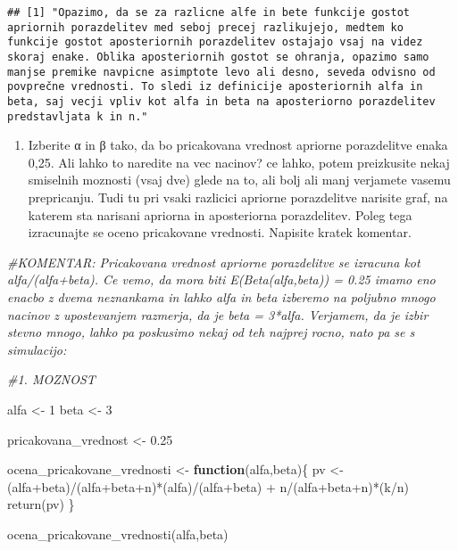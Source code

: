 \documentclass[
]{article}
\newenvironment{Shaded}{\begin{snugshade}}{\end{snugshade}}
\newcommand{\CommentTok}[1]{\textcolor[rgb]{0.56,0.35,0.01}{\textit{#1}}}
\newcommand{\ControlFlowTok}[1]{\textcolor[rgb]{0.13,0.29,0.53}{\textbf{#1}}}
\newcommand{\DecValTok}[1]{\textcolor[rgb]{0.00,0.00,0.81}{#1}}
\newcommand{\FloatTok}[1]{\textcolor[rgb]{0.00,0.00,0.81}{#1}}
\newcommand{\FunctionTok}[1]{\textcolor[rgb]{0.00,0.00,0.00}{#1}}
\newcommand{\NormalTok}[1]{#1}
\newcommand{\OtherTok}[1]{\textcolor[rgb]{0.56,0.35,0.01}{#1}}
\newcommand{\SpecialCharTok}[1]{\textcolor[rgb]{0.00,0.00,0.00}{#1}}
\providecommand{\tightlist}{%
  \setlength{\itemsep}{0pt}\setlength{\parskip}{0pt}}
\begin{document}
\begin{verbatim}
## [1] "Opazimo, da se za razlicne alfe in bete funkcije gostot apriornih porazdelitev med seboj precej razlikujejo, medtem ko funkcije gostot aposteriornih porazdelitev ostajajo vsaj na videz skoraj enake. Oblika aposteriornih gostot se ohranja, opazimo samo manjse premike navpicne asimptote levo ali desno, seveda odvisno od povprečne vrednosti. To sledi iz definicije aposteriornih alfa in beta, saj vecji vpliv kot alfa in beta na aposteriorno porazdelitev predstavljata k in n."
\end{verbatim}

\begin{enumerate}
\def\labelenumi{\arabic{enumi}.}
\setcounter{enumi}{1}
\tightlist
\item
  Izberite α in β tako, da bo pricakovana vrednost apriorne porazdelitve
  enaka 0,25. Ali lahko to naredite na vec nacinov? ce lahko, potem
  preizkusite nekaj smiselnih moznosti (vsaj dve) glede na to, ali bolj
  ali manj verjamete vasemu prepricanju. Tudi tu pri vsaki razlicici
  apriorne porazdelitve narisite graf, na katerem sta narisani apriorna
  in aposteriorna porazdelitev. Poleg tega izracunajte se oceno
  pricakovane vrednosti. Napisite kratek komentar.
\end{enumerate}

\begin{Shaded}
\begin{Highlighting}[]
\CommentTok{\#KOMENTAR: Pricakovana vrednost apriorne porazdelitve se izracuna kot alfa/(alfa+beta). Ce vemo, da mora biti E(Beta(alfa,beta)) = 0.25 imamo eno enacbo z dvema neznankama in lahko alfa in beta izberemo na poljubno mnogo nacinov z upostevanjem razmerja, da je beta = 3*alfa. Verjamem, da je izbir stevno mnogo, lahko pa poskusimo nekaj od teh najprej rocno, nato pa se s simulacijo:}

\CommentTok{\#1. MOZNOST }

\NormalTok{alfa }\OtherTok{\textless{}{-}} \DecValTok{1}
\NormalTok{beta }\OtherTok{\textless{}{-}} \DecValTok{3}

\NormalTok{pricakovana\_vrednost }\OtherTok{\textless{}{-}} \FloatTok{0.25}

\NormalTok{ocena\_pricakovane\_vrednosti }\OtherTok{\textless{}{-}} \ControlFlowTok{function}\NormalTok{(alfa,beta)\{}
\NormalTok{  pv }\OtherTok{\textless{}{-}}\NormalTok{ (alfa}\SpecialCharTok{+}\NormalTok{beta)}\SpecialCharTok{/}\NormalTok{(alfa}\SpecialCharTok{+}\NormalTok{beta}\SpecialCharTok{+}\NormalTok{n)}\SpecialCharTok{*}\NormalTok{(alfa)}\SpecialCharTok{/}\NormalTok{(alfa}\SpecialCharTok{+}\NormalTok{beta) }\SpecialCharTok{+}\NormalTok{ n}\SpecialCharTok{/}\NormalTok{(alfa}\SpecialCharTok{+}\NormalTok{beta}\SpecialCharTok{+}\NormalTok{n)}\SpecialCharTok{*}\NormalTok{(k}\SpecialCharTok{/}\NormalTok{n)}
  \FunctionTok{return}\NormalTok{(pv)}
\NormalTok{\}}

\FunctionTok{ocena\_pricakovane\_vrednosti}\NormalTok{(alfa,beta)}
\end{Highlighting}
\end{Shaded}
\end{document}

